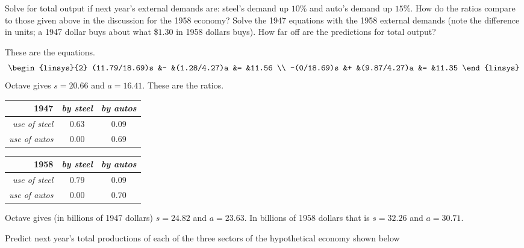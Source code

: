 \begin{exercises}
\begin{exparts}
      \partsitem Solve for total output if next year's external
         demands are: steel's demand up $10$\% and auto's demand up
         $15$\%.
      \partsitem How do the ratios compare to those given above in the
         discussion for the 1958 economy?
      \partsitem Solve the 1947 equations with the 1958 external demands
         (note the difference in units; a 1947 dollar buys about
         what \$$1.30$ in 1958 dollars buys).
         How far off are the predictions for total output?
    \end{exparts}
    \begin{answer}
      \begin{exparts}
        \partsitem 
          These are the equations.
	  \begin{equation*}
	    \begin{linsys}{2}
	       (11.79/18.69)s   &-   &(1.28/4.27)a &= &11.56 \\ 
	       -(0/18.69)s   &+   &(9.87/4.27)a &= &11.35 
	    \end{linsys}
	  \end{equation*}
          Octave gives $s=20.66$ and $a=16.41$.
	\partsitem
          These are the ratios.
	  \begin{center}
            \begin{tabular}{r|cc}
               1947   &\textit{by steel}  &\textit{by autos}  \\ \hline
               \textit{use of steel}  &$0.63$ &$0.09$  \\
               \textit{use of autos}  &$0.00$ &$0.69$  
            \end{tabular}
            \qquad
            \begin{tabular}{r|cc}
               1958   &\textit{by steel}  &\textit{by autos}  \\ \hline
               \textit{use of steel}  &$0.79$ &$0.09$  \\
               \textit{use of autos}  &$0.00$ &$0.70$  
            \end{tabular}
          \end{center}
	\partsitem
          Octave gives (in billions of 1947 dollars) $s=24.82$ and $a=23.63$.
          In billions of 1958 dollars that is $s=32.26$ and $a=30.71$.
      \end{exparts}
    \end{answer}
  \item 
    Predict next year's total productions of each of the three
    sectors of the hypothetical economy shown below

\end{exercises}
